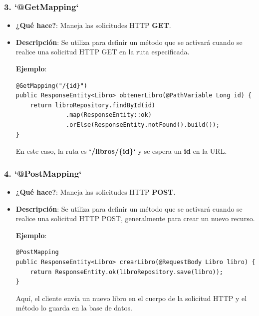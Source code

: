 \documentclass[11pt]{article}
\begin{document}
\subsubsection{3. \textbf{\textbf{`@GetMapping`}}}
\label{sec:orgb6c305a}
\begin{itemize}
\item \textbf{\textbf{¿Qué hace?}}: Maneja las solicitudes HTTP \textbf{\textbf{GET}}.
\item \textbf{\textbf{Descripción}}: Se utiliza para definir un método que se activará cuando se realice una solicitud HTTP GET en la ruta especificada.

\textbf{\textbf{Ejemplo}}:
\begin{verbatim}
@GetMapping("/{id}")
public ResponseEntity<Libro> obtenerLibro(@PathVariable Long id) {
    return libroRepository.findById(id)
              .map(ResponseEntity::ok)
              .orElse(ResponseEntity.notFound().build());
}
\end{verbatim}

En este caso, la ruta es \textbf{\textbf{`/libros/\{id\}`}} y se espera un \textbf{\textbf{id}} en la URL.
\end{itemize}

\subsubsection{4. \textbf{\textbf{`@PostMapping`}}}
\label{sec:orgfa1c8f1}
\begin{itemize}
\item \textbf{\textbf{¿Qué hace?}}: Maneja las solicitudes HTTP \textbf{\textbf{POST}}.
\item \textbf{\textbf{Descripción}}: Se utiliza para definir un método que se activará cuando se realice una solicitud HTTP POST, generalmente para crear un nuevo recurso.

\textbf{\textbf{Ejemplo}}:
\begin{verbatim}
@PostMapping
public ResponseEntity<Libro> crearLibro(@RequestBody Libro libro) {
    return ResponseEntity.ok(libroRepository.save(libro));
}
\end{verbatim}

Aquí, el cliente envía un nuevo libro en el cuerpo de la solicitud HTTP y el método lo guarda en la base de datos.
\end{itemize}
\end{document}
